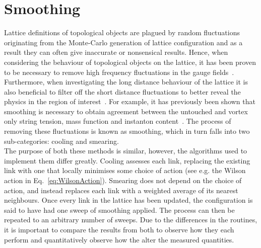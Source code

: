 
\chapter{Smoothing}
\ifpdf
    \graphicspath{{Chapter5/Figs/Raster/}{Chapter5/Figs/PDF/}{Chapter5/Figs/}}
\else
    \graphicspath{{Chapter5/Figs/Vector/}{Chapter5/Figs/}}
\fi

Lattice definitions of topological objects are plagued by random fluctuations originating from the Monte-Carlo generation of lattice configuration and as a result they can often give inaccurate or nonsensical results. Hence, when considering the behaviour of topological objects on the lattice, it has been proven to be necessary to remove high frequency fluctuations in the gauge fields~\cite{Bonnet:2000dc}. Furthermore, when investigating the long distance behaviour of the lattice it is also beneficial to filter off the short distance fluctuations to better reveal the physics in the region of interest~\cite{Moran:2008ra}. For example, it has previously been shown that smoothing is necessary to obtain agreement between the untouched and vortex only string tension, mass function and instanton content~\cite{Trewartha:2015ida,Trewartha:2015nna,Trewartha:2017ive}. The process of removing these fluctuations is known as smoothing, which in turn falls into two sub-categories: cooling and smearing.\\

The purpose of both these methods is similar, however, the algorithms used to implement them differ greatly. Cooling assesses each link, replacing the existing link with one that locally minimises some choice of action (see e.g. the Wilson action in Eq.~\ref{eq:WilsonAction}). Smearing does not depend on the choice of action, and instead replaces each link with a weighted average of its nearest neighbours. Once every link in the lattice has been updated, the configuration is said to have had one sweep of smoothing applied. The process can then be repeated to an arbitrary number of sweeps.  Due to the differences in the routines, it is important to compare the results from both to observe how they each perform and quantitatively observe how the alter the measured quantities.


